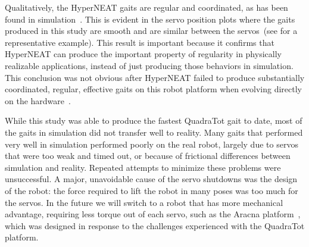 Qualitatively, the HyperNEAT gaits are regular and coordinated, as has been found in simulation~\cite{clune2009evolving,clune2011performance}. This is evident in the servo position plots where the gaits produced in this study are smooth and are similar between the servos~(see  for a representative example). This result is important because it confirms that HyperNEAT can produce the important property of regularity in physically realizable applications, instead of just producing those behaviors in simulation. This conclusion was not obvious after HyperNEAT failed to produce substantially coordinated, regular, effective gaits on this robot platform when evolving directly on the hardware~\cite{yos:clune}. 

While this study was able to produce the fastest QuadraTot gait to date, most of the gaits in simulation did not transfer well to reality. Many gaits that performed very well in simulation performed poorly on the real robot, largely due to servos that were too weak and timed out, or because of frictional differences between simulation and reality. Repeated attempts to minimize these problems were unsuccessful. 
A major, unavoidable cause of the servo shutdowns was the design of the robot: the force required to lift the robot in many poses was too much for the servos. In the future we will switch to a robot that has more mechanical advantage, requiring less torque out of each servo, such as the Aracna platform~\cite{lohmann2012aracna}, which was designed in response to the challenges experienced with the QuadraTot platform.  


%
%



